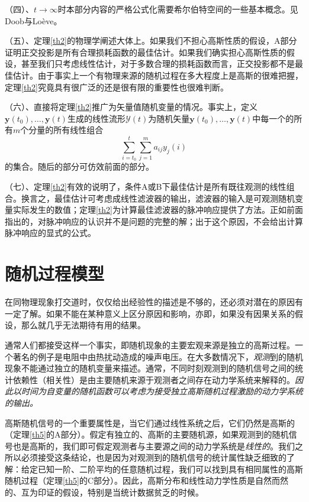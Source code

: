 \documentclass[UTF8,adobefonts]{ctexart}
\begin{document}
{}
（四）、$t \to \infty$时本部分内容的严格公式化需要希尔伯特空间的一些基本概念。见Doob\cite{rf15}与Lo\`eve\cite{rf16}。

（五）、定理\ref{th2}的物理学阐述大体上。如果我们不担心高斯性质的假设，A部分证明正交投影是所有合理损耗函数的最佳估计。如果我们确实担心高斯性质的假设，甚至我们只考虑线性估计，对于多数合理的损耗函数而言，正交投影都不是最佳估计。由于事实上一个有物理来源的随机过程在多大程度上是高斯的很难把握，定理\ref{th2}究竟具有很广泛的还是很有限的重要性也很难判断。

（六）、直接将定理\ref{th2}推广为矢量值随机变量的情况。事实上，定义$\mathbf{y}(t_0),\dotsc,\mathbf{y}(t)$生成的线性流形$\mathbf{\mathcal{Y}}(t)$为随机矢量$\mathbf{y}(t_0),\dotsc,\mathbf{y}(t)$中每一个的所有$m$个分量的所有线性组合
\begin{equation*}
\sum^t_{i=t_0}\sum^m_{j=1}a_{ij}y_j (i)
\end{equation*}
的集合。随后的部分可仿效前面的部分。

（七）、定理\ref{th2}有效的说明了，条件A或B下最佳估计是所有既往观测的线性组合。换言之，最佳估计可考虑成线性滤波器的输出，滤波器的输入是可观测随机变量实际发生的数值；定理\ref{th2}为计算最佳滤波器的脉冲响应提供了方法。正如前面指出的，对脉冲响应的认识并不是问题的完整的解；出于这个原因，不会给出计算脉冲响应的显式的公式。

\section{随机过程模型}
在同物理现象打交道时，仅仅给出经验性的描述是不够的，还必须对潜在的原因有一定了解。如果不能在某种意义上区分原因和影响，亦即，如果没有因果关系的假设，那么就几乎无法期待有用的结果。

通常人们都接受这样一个事实，即随机现象的主要宏观来源是独立的高斯过程。一个著名的例子是电阻中由热扰动造成的噪声电压。在大多数情况下，\emph{观测}到的随机现象不能通过独立的随机变量来描述。通常，不同时刻观测到的随机信号之间的统计依赖性（相关性）是由主要随机来源于观测者之间存在动力学系统来解释的。\emph{因此以时间为自变量的随机函数可以考虑为接受独立高斯随机过程激励的动力学系统的输出。}

高斯随机信号的一个重要属性是，当它们通过线性系统之后，它们仍然是高斯的（定理\ref{th5}的A部分）。假定有独立的、高斯的主要随机源，如果观测到的随机信号也是高斯的，我们即可假定观测者与主要源之间的动力学系统是\emph{线性的}。我们之所以必须接受这条结论，也是因为对观测到的随机信号的统计属性缺乏细致的了解：给定已知一阶、二阶平均的任意随机过程，我们可以找到具有相同属性的高斯随机过程（定理\ref{th5}的C部分）。因此，高斯分布和线性动力学性质是自然而然的、互为印证的假设，特别是当统计数据贫乏的时候。
\end{document}
